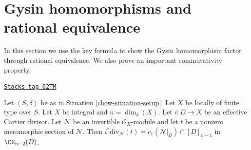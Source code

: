 \section{Gysin homomorphisms and rational equivalence}
\label{chow-section-gysin}
In this section we use the key formula to show the Gysin homomorphism
factor through rational equivalence. We also prove an important
commutativity property.

\begin{lemma}
\label{chow-lemma-gysin-factors-general}
\href{https://stacks.math.columbia.edu/tag/02TM}{\texttt{Stacks tag 02TM}}

Let $(S, \delta)$ be as in Situation \ref{chow-situation-setup}.
Let $X$ be locally of finite type over $S$.
Let $X$ be integral and $n = \dim_\delta(X)$.
Let $i : D \to X$ be an effective Cartier divisor.
Let $\mathcal{N}$ be an invertible $\mathcal{O}_X$-module
and let $t$ be a nonzero meromorphic section of $\mathcal{N}$.
Then $i^*\text{div}_\mathcal{N}(t) = c_1(\mathcal{N}|_D) \cap [D]_{n - 1}$
in $\CH_{n - 2}(D)$.
\end{lemma}

